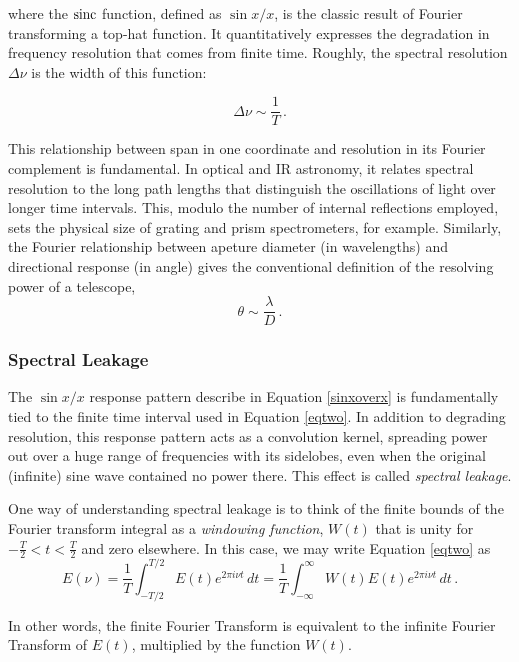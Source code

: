 \documentclass[11pt,preprint]{aastex}
\begin{document}
\noindent where the ${\rm sinc}$ function, defined as $\sin x / x$, is the classic
result of Fourier transforming a top-hat function.
It quantitatively expresses the degradation in frequency
resolution that comes from finite time. Roughly, the spectral
resolution $\Delta\nu$ is the width of this function:

\begin{equation}
\Delta \nu \sim \frac1T\, .
\end{equation}

This relationship between span in one coordinate and 
resolution in its Fourier complement is fundamental.
In optical and IR astronomy, it relates spectral
resolution to the long path lengths that distinguish the oscillations of light
over longer time intervals.
This, modulo the number of internal reflections employed, sets the physical size 
of grating and prism spectrometers, for example.
Similarly, the Fourier relationship between apeture diameter (in wavelengths)
and directional response (in angle)
gives the conventional definition of the resolving power of a telescope,
\begin{equation}
\theta\sim\frac\lambda{D}\, .
\end{equation}

\subsubsection{Spectral Leakage}

\noindent
The $\sin x/x$ response pattern describe in Equation \ref{sinxoverx}
is fundamentally tied to the finite time interval used in Equation \ref{eqtwo}.
In addition to degrading resolution, this
response pattern acts as a convolution kernel, spreading power out
over a huge range of frequencies with its sidelobes, even when the
original (infinite) sine wave contained no power there.
This effect is called
{\it spectral leakage}.

One way of understanding spectral leakage is to think of the finite
bounds of the Fourier transform integral as a {\it windowing function},
$W(t)$ that is unity for $-\frac{T}{2} < t < \frac{T}{2}$ and zero elsewhere.
In this case, we may write Equation \ref{eqtwo} as
\begin{equation} \label{windowfunc}
E(\nu)=\frac1T\int_{-T/2}^{T/2} E(t)e^{2\pi i\nu t}\,dt
=\frac1T\int_{-\infty}^{\infty} W(t)E(t)e^{2\pi i\nu t}\,dt\, .
\end{equation}

\noindent
In other words, the finite Fourier Transform is equivalent to the infinite
Fourier Transform of $E(t)$, multiplied by the function $W(t)$.
\end{document}
